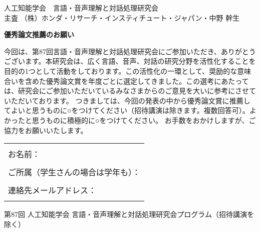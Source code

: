\documentclass[a4paper,10pt]{jarticle}
\def\GM{（株）ホンダ・リサーチ・インスティチュート・ジャパン・中野 幹生}
\def\ORDER{87}
\def\NOTE{招待講演を除く}
\begin{document}
\pagestyle{empty}

\begin{flushright}
人工知能学会　言語・音声理解と対話処理研究会\\
主査 \GM
\end{flushright}


\begin{center}
\large \bf
優秀論文推薦のお願い	
\end{center}


今回は、第{\ORDER}回言語・音声理解と対話処理研究会にご参加いただき、ありがとうございます。本研究会は、広く言語、音声、対話の研究分野を活性化することを目的の1つとして活動をしております。この活性化の一環として、奨励的な意味合いを含めた優秀論文賞を年度ごとに選定してきました。この選考にあたっては、研究会にご参加いただいているみなさまからのご意見を大いに参考にさせていただいております。
つきましては、今回の発表の中から優秀論文賞に推薦してよいと思うものに○をつけてください（招待講演は除きます。複数回答可）。よかったと思うものに積極的に○をつけてください。
お手数をおかけしますが、ご協力をお願いいたします。

\begin{table}[h]
\begin{tabular}{p{17.5cm}}
\hline
\\
お名前： \\
\\
ご所属（学生さんの場合は学年も）：\\
\\
連絡先メールアドレス：\\
\\
\hline
\end{tabular}
\end{table}

\begin{center}
第{\ORDER}回 人工知能学会 言語・音声理解と対話処理研究会プログラム（\NOTE）	
\end{center}


\end{document}
